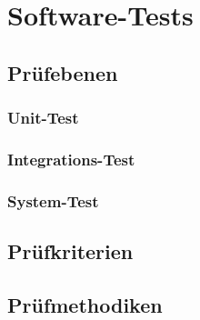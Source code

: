 \chapter{Software-Tests}
\label{sec:softwarequalitaet}

\section{Prüfebenen}

\subsection{Unit-Test}

\subsection{Integrations-Test}

\subsection{System-Test}

\section{Prüfkriterien}

\section{Prüfmethodiken}